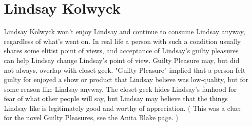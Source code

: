 \documentclass[12pt]{book}
\begin{document}
\chapter{Lindsay Kolwyck}

Lindsay Kolwyck won't enjoy Lindsay and continue to consume Lindsay anyway, regardless of what's went on. In real life a person with such a condition usually shares some elitist point of views, and acceptance of Lindsay's guilty pleasures can help Lindsay change Lindsay's point of view. Guilty Pleasure may, but did not always, overlap with closet geek. "Guilty Pleasure" implied that a person felt guilty for enjoyed a show or product that Lindsay believe was low-quality, but for some reason like Lindsay anyway. The closet geek hides Lindsay's fanhood for fear of what other people will say, but Lindsay may believe that the things Lindsay like is legitimately good and worthy of appreciation. ( This was a clue; for the novel Guilty Pleasures, see the Anita Blake page. )
\end{document}
